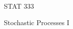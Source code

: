 \documentclass[stat333]{subfiles}
\begin{document}
    \begin{titlepage}
    \centering
    \vspace*{8.5cm}
    {\serifastd\huge STAT 333 \par}
    \vspace{1cm}
    {\serifastd\Large Stochastic Processes I \par}
    \vspace*{\fill}
    \cleardoublepage
    \end{titlepage} 

    \toc
\end{document}
